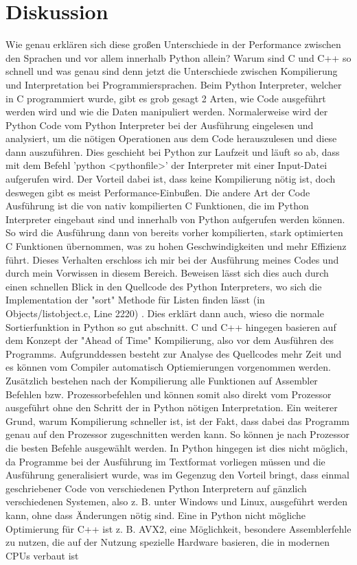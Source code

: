 \documentclass[10pt,a4paper]{article}
\begin{document}
\clearpage

\section{Diskussion}

Wie genau erklären sich diese großen Unterschiede in der Performance zwischen den Sprachen und vor allem innerhalb Python allein?
Warum sind C und C++ so schnell und was genau sind denn jetzt die Unterschiede zwischen Kompilierung und Interpretation bei Programmiersprachen.
Beim Python Interpreter, welcher in C programmiert wurde, gibt es grob gesagt 2 Arten, wie Code ausgeführt werden wird und
wie die Daten manipuliert werden. Normalerweise wird der Python Code vom Python Interpreter bei der Ausführung eingelesen und analysiert,
um die nötigen Operationen aus dem Code herauszulesen und diese dann auszuführen. Dies geschieht bei Python zur Laufzeit und läuft so ab,
dass mit dem Befehl 'python <pythonfile>' der Interpreter mit einer Input-Datei aufgerufen wird. Der Vorteil dabei ist, dass keine Kompilierung nötig ist,
doch deswegen gibt es meist Performance-Einbußen. Die andere Art der Code Ausführung ist die von nativ kompilierten C Funktionen,
die im Python Interpreter eingebaut sind und innerhalb von Python aufgerufen werden können. So wird die Ausführung dann von
bereits vorher kompilierten, stark optimierten C Funktionen übernommen, was zu hohen Geschwindigkeiten und mehr Effizienz führt.
Dieses Verhalten erschloss ich mir bei der Ausführung meines Codes und durch mein Vorwissen in diesem Bereich. Beweisen lässt sich
dies auch durch einen schnellen Blick in den Quellcode des Python Interpreters, wo sich die Implementation der "sort" Methode für Listen
finden lässt (in Objects/listobject.c, Line 2220) \cite{pythonsource}. Dies erklärt dann auch, wieso die normale Sortierfunktion in Python so gut abschnitt.
C und C++ hingegen basieren auf dem Konzept der "Ahead of Time" Kompilierung, also vor dem Ausführen des Programms.
Aufgrunddessen besteht zur Analyse des Quellcodes mehr Zeit und es können vom Compiler automatisch Optiemierungen vorgenommen werden.
Zusätzlich bestehen nach der Kompilierung alle Funktionen auf Assembler Befehlen bzw. Prozessorbefehlen und können somit 
also direkt vom Prozessor ausgeführt ohne den Schritt der in Python nötigen Interpretation.
Ein weiterer Grund, warum Kompilierung schneller ist, ist der Fakt, dass dabei das Programm genau auf den Prozessor zugeschnitten
werden kann. So können je nach Prozessor die besten Befehle ausgewählt werden. In Python hingegen ist dies nicht möglich,
da Programme bei der Ausführung im Textformat vorliegen müssen und die Ausführung generalisiert wurde, was im Gegenzug den Vorteil bringt,
dass einmal geschriebener Code von verschiedenen Python Interpretern auf gänzlich verschiedenen Systemen, also z. B. unter Windows und Linux,
ausgeführt werden kann, ohne dass Änderungen nötig sind.
Eine in Python nicht mögliche Optimierung für C++ ist z. B. AVX2, eine Möglichkeit, besondere Assemblerfehle
zu nutzen, die auf der Nutzung spezielle Hardware basieren, die in modernen CPUs verbaut ist 
\end{document}
